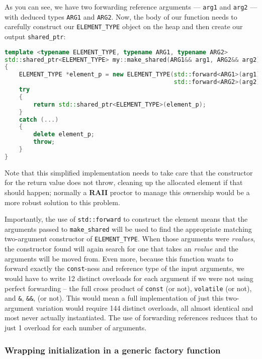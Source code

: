 \noindent As you can see, we have two forwarding reference arguments ---
\texttt{arg1} and \texttt{arg2} --- with deduced types \texttt{ARG1} and
\texttt{ARG2}. Now, the body of our function needs to carefully
construct our \texttt{ELEMENT\_TYPE} object on the heap and then create
our output \texttt{shared\_ptr}:

\begin{lstlisting}[language=C++]
template <typename ELEMENT_TYPE, typename ARG1, typename ARG2>
std::shared_ptr<ELEMENT_TYPE> my::make_shared(ARG1&& arg1, ARG2&& arg2)
{
    ELEMENT_TYPE *element_p = new ELEMENT_TYPE(std::forward<ARG1>(arg1),
                                               std::forward<ARG2>(arg2));
    try
    {
        return std::shared_ptr<ELEMENT_TYPE>(element_p);
    }
    catch (...)
    {
        delete element_p;
        throw;
    }
}
\end{lstlisting}
    
\noindent Note that this simplified implementation needs to take care that the
constructor for the return value does not throw, cleaning up the
allocated element if that should happen; normally a \textbf{RAII}
proctor to manage this ownership would be a more robust solution to this
problem.

Importantly, the use of \texttt{std::forward} to construct the element
means that the arguments passed to \texttt{make\_shared} will be used to
find the appropriate matching two-argument constructor of
\texttt{ELEMENT\_TYPE}. When those arguments were \emph{rvalues}, the
constructor found will again search for one that takes an \emph{rvalue}
and the arguments will be moved from. Even more, because this function
wants to forward exactly the \texttt{const}-ness and reference type of
the input arguments, we would have to write 12 distinct overloads for
each argument if we were not using perfect forwarding -- the full cross
product of \texttt{const} (or not), \texttt{volatile} (or not), and
\texttt{\&}, \texttt{\&\&}, (or not). This would mean a full
implementation of just this two-argument variation would require 144
distinct overloads, all almost identical and most never actually
instantiated. The use of forwarding references reduces that to just 1
overload for each number of arguments.

\subsubsection[Wrapping initialization in a generic factory function]{Wrapping initialization in a generic factory function}\label{wrapping-initialization-in-a-generic-factory-function}

